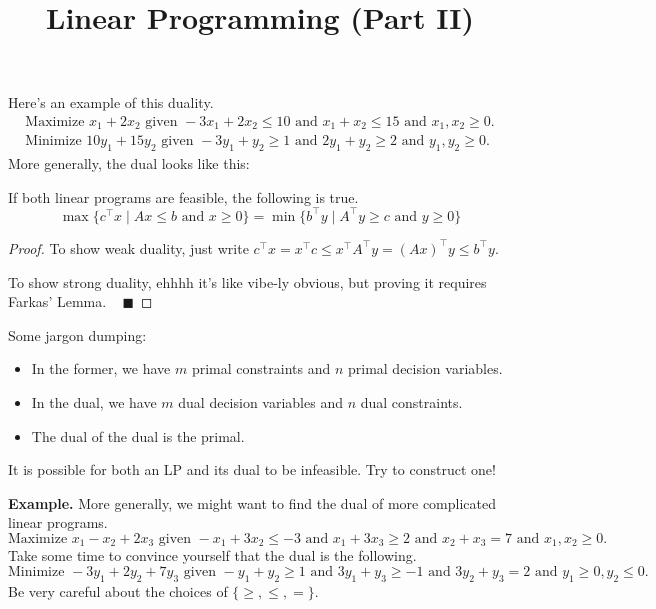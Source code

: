 \title{Linear Programming (Part II)}



Here's an example of this duality.
\begin{align*}
    \text{Maximize } x_1 + 2x_2 \text{ given } -3x_1 + 2x_2 \leq 10 \text{ and } x_1 + x_2 \leq 15 \text{ and } x_1, x_2 \geq 0. \\
    \text{Minimize } 10y_1 + 15y_2 \text{ given } -3y_1 + y_2 \geq 1 \text{ and } 2y_1 + y_2 \geq 2 \text{ and } y_1, y_2 \geq 0.
\end{align*}
More generally, the dual looks like this:

\begin{claim}
If both linear programs are feasible, the following is true.
\[ \max\{ c^{\top} x \mid A x \leq b \text{ and } x \geq 0 \} = \min\{ b^{\top}y \mid A^{\top}y \geq c \text{ and } y \geq 0 \} \]
\end{claim} \vspace{-0.8cm}

\begin{proof}
    To show weak duality, just write $c^{\top}x = x^{\top}c \leq x^{\top}A^{\top}y = (Ax)^{\top}y \leq b^{\top}y$.

    To show strong duality, ehhhh it's like vibe-ly obvious, but proving it requires Farkas' Lemma. ~ $\blacksquare$
\end{proof}

Some jargon dumping:
\begin{itemize}
    \item In the former, we have $m$ primal constraints and $n$ primal decision variables.
    \item In the dual, we have $m$ dual decision variables and $n$ dual constraints. 
    \item The dual of the dual is the primal.
\end{itemize}

\begin{remark}
    It is possible for both an LP and its dual to be infeasible.  Try to construct one!
\end{remark}

\textbf{Example.} More generally, we might want to find the dual of more complicated linear programs.
\[ \text{Maximize } x_1 - x_2 + 2x_3 \text{ given } -x_1 + 3x_2 \leq -3 \text{ and } x_1 + 3x_3 \geq 2 \text{ and } x_2 + x_3 = 7 \text{ and } x_1, x_2 \geq 0. \]
Take some time to convince yourself that the dual is the following.
\[ \text{Minimize } -3y_1 + 2y_2 + 7y_3 \text{ given } -y_1 + y_2 \geq 1 \text{ and } 3y_1 + y_3 \geq -1 \text{ and } 3y_2 + y_3 = 2 \text{ and } y_1 \geq 0, y_2 \leq 0. \]
Be very careful about the choices of $\{\geq, \leq, =\}$.

